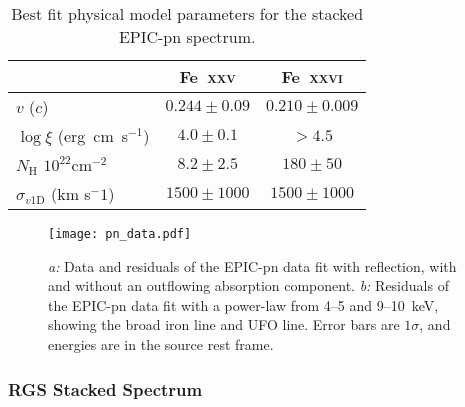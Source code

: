 \documentclass[10pt, a4paper]{article}
\begin{document}
\begin{table}
\centering
\caption{Best fit physical model parameters for the stacked EPIC-pn spectrum.}
\label{table_physicalpn}
\begin{tabular}{l c c}
\hline
& Fe~\textsc{xxv} & Fe~\textsc{xxvi}\\
\hline
$v$ ($c$) & $0.244\pm0.09$& $0.210\pm0.009$\\
$\log{\xi}$ (erg~cm~s$^{-1}$) & $4.0\pm0.1$ & $>4.5$\\
$N_\mathrm{H}$ $10^{22}$cm$^{-2}$ & $8.2\pm2.5$ & $180\pm50$\\
$\sigma_{v\mathrm{1D}}$ (km s$^-1$)& $1500\pm1000$ & $1500\pm1000$ \\
\hline


\end{tabular}

\end{table}


\begin{figure}[h]
\texttt{[image: pn\_data.pdf]}
\caption{\emph{a:} Data and residuals of the EPIC-pn data fit with reflection, with and without an outflowing absorption component. \emph{b:} Residuals of the EPIC-pn data fit with a power-law from 4--5 and 9--10~keV, showing the broad iron line and UFO line. Error bars are $1\sigma$, and energies are in the source rest frame.}
\label{fig_archival_comparison}
\end{figure}


\subsubsection*{RGS Stacked Spectrum}
\end{document}
